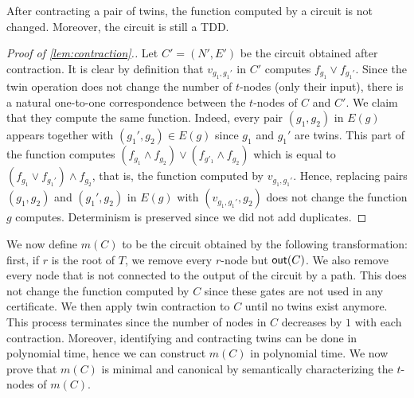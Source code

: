 \documentclass[a4paper,UKenglish,cleveref, autoref, thm-restate]{lipics-v2021}
\begin{document}
\begin{lemma}[$\star$] \label{lem:contraction}
  After contracting a pair of twins, the function computed by a circuit is not changed. Moreover, the circuit is still a TDD.
\end{lemma}
\begin{toappendix}
\begin{proof}[Proof of \cref{lem:contraction}.]
Let $C'=(N',E')$ be the circuit obtained after contraction.  It is clear by definition that $v_{g_1,g_1'}$ in $C'$ computes $f_{g_1} \vee f_{g_1'}$. Since the twin operation does not change the number of $t$-nodes (only their input), there is a natural one-to-one correspondence between the $t$-nodes of $C$ and $C'$. We claim that they compute the same function. Indeed, every pair $(g_1,g_2)$ in $E(g)$ appears together with $(g_1',g_2) \in E(g)$ since $g_1$ and $g_1'$ are twins. This part of the function computes $(f_{g_1} \wedge f_{g_2}) \vee (f_{g'_1} \wedge f_{g_2})$ which is equal to $(f_{g_1} \vee f_{g_1'}) \wedge f_{g_2}$, that is, the function computed by $v_{g_1,g_1'}$. Hence, replacing pairs $(g_1,g_2)$ and $(g_1',g_2)$ in $E(g)$ with $(v_{g_1,g_1'},g_2)$ does not change the function $g$ computes. Determinism is preserved since we did not add duplicates.
\end{proof}
\end{toappendix}
We now define $m(C)$ to be the circuit obtained by the following transformation: first, if $r$ is the root of $T$, we remove every $r$-node but $\out$. We also remove every node that is not connected to the output of the circuit by a path. This does not change the function computed by $C$ since these gates are not used in any certificate. We then apply twin contraction to $C$ until no twins exist anymore. This process terminates since the number of nodes in $C$ decreases by $1$ with each contraction. Moreover, identifying and contracting twins can be done in polynomial time, hence we can construct $m(C)$ in polynomial time. We now prove that $m(C)$ is minimal and canonical by semantically characterizing the $t$-nodes of $m(C)$. 
\end{document}
